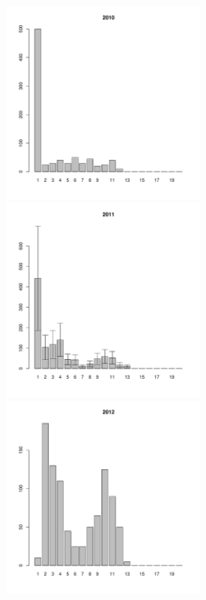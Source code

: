 \documentclass[12pt, a4paper]{article}
\begin{document}
\begin{figure}[h]

\begin{multicols}{3}
\hfill
\includegraphics[width=65mm]{../White_Sea/Luvenga_Goreliy/middle_2010_.pdf}
\hfill
\end{multicols}

\begin{multicols}{3}
\hfill
\includegraphics[width=65mm]{../White_Sea/Luvenga_Goreliy/middle_2011_.pdf}
\end{multicols}



\begin{multicols}{3}
\hfill
\includegraphics[width=65mm]{../White_Sea/Luvenga_Goreliy/middle_2012_.pdf}
\end{multicols}


\end{figure}
\end{document}
